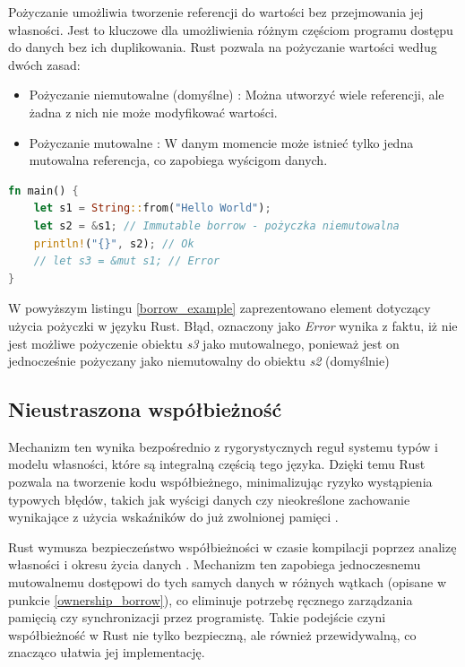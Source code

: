 Pożyczanie  umożliwia tworzenie referencji do wartości bez przejmowania jej własności. Jest to kluczowe dla umożliwienia różnym częściom programu dostępu do danych bez ich duplikowania. Rust pozwala na pożyczanie wartości według dwóch zasad:
\begin{itemize}
    \item Pożyczanie niemutowalne (domyślne) : Można utworzyć wiele referencji, ale żadna z nich nie może modyfikować wartości.
    \item Pożyczanie mutowalne : W danym momencie może istnieć tylko jedna mutowalna referencja, co zapobiega wyścigom danych.
\end{itemize}
\begin{lstlisting}[language=Rust,caption=Przykład mechanizmu borrow, label=borrow_example]
fn main() {
    let s1 = String::from("Hello World");
    let s2 = &s1; // Immutable borrow - pożyczka niemutowalna
    println!("{}", s2); // Ok
    // let s3 = &mut s1; // Error
}
\end{lstlisting}
W powyższym listingu \ref{borrow_example} zaprezentowano element dotyczący użycia pożyczki w języku Rust. Błąd, oznaczony jako \textit{Error} wynika z faktu, iż nie jest możliwe pożyczenie obiektu \textit{s3} jako mutowalnego, ponieważ jest on jednocześnie pożyczany jako niemutowalny do obiektu \textit{s2} (domyślnie)


\subsection{Nieustraszona współbieżność}
Mechanizm ten wynika bezpośrednio z rygorystycznych reguł systemu typów i modelu własności, które są integralną częścią tego języka. Dzięki temu Rust pozwala na tworzenie kodu współbieżnego, minimalizując ryzyko wystąpienia typowych błędów, takich jak wyścigi danych czy nieokreślone zachowanie wynikające z użycia wskaźników do już zwolnionej pamięci .

Rust wymusza bezpieczeństwo współbieżności w czasie kompilacji poprzez analizę własności i okresu życia danych . Mechanizm ten zapobiega jednoczesnemu mutowalnemu dostępowi do tych samych danych w różnych wątkach (opisane w punkcie \ref{ownership_borrow}), co eliminuje potrzebę ręcznego zarządzania pamięcią czy synchronizacji przez programistę. Takie podejście czyni współbieżność w Rust nie tylko bezpieczną, ale również przewidywalną, co znacząco ułatwia jej implementację. \cite{RustFC}

